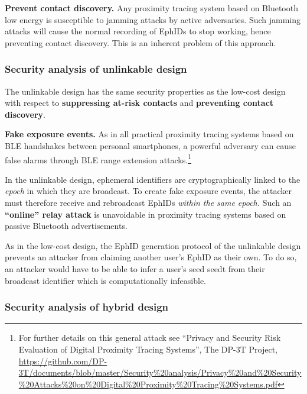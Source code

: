 \documentclass{article}
\begin{document}
\textbf{Prevent contact discovery.} Any proximity tracing system based
on Bluetooth low energy is susceptible to jamming attacks by active
adversaries. Such jamming attacks will cause the normal recording of
EphIDs to stop working, hence preventing contact discovery. This is an
inherent problem of this approach.

\hypertarget{security-analysis-of-unlinkable-design}{%
\subsubsection{Security analysis of unlinkable
design}\label{security-analysis-of-unlinkable-design}}

The unlinkable design has the same security properties as the low-cost
design with respect to \textbf{suppressing at-risk contacts} and
\textbf{preventing contact discovery}.

\textbf{Fake exposure events.} As in all practical proximity tracing
systems based on BLE handshakes between personal smartphones, a powerful
adversary can cause false alarms through BLE range extension
attacks.\footnote{For further details on this general attack see
  ``Privacy and Security Risk Evaluation of Digital Proximity Tracing
  Systems'', The DP-3T Project,
  \href{https://github.com/DP-3T/documents/blob/master/Security\%20analysis/Privacy\%20and\%20Security\%20Attacks\%20on\%20Digital\%20Proximity\%20Tracing\%20Systems.pdf}{{https://github.com/DP-3T/documents/blob/master/Security\%20analysis/Privacy\%20and\%20Security\%20Attacks\%20on\%20Digital\%20Proximity\%20Tracing\%20Systems.pdf}}}

In the unlinkable design, ephemeral identifiers are cryptographically
linked to the \emph{epoch} in which they are broadcast. To create fake
exposure events, the attacker must therefore receive and rebroadcast
EphIDs \emph{within the same epoch.} Such an \textbf{``online'' relay
attack} is unavoidable in proximity tracing systems based on passive
Bluetooth advertisements.

As in the low-cost design, the EphID generation protocol of the
unlinkable design prevents an attacker from claiming another user's
EphID as their own. To do so, an attacker would have to be able to infer
a user's seed seedt from their broadcast identifier which is
computationally infeasible.

\subsubsection{Security analysis of hybrid
design}\label{security-analysis-of-hybrid-design}
\end{document}
